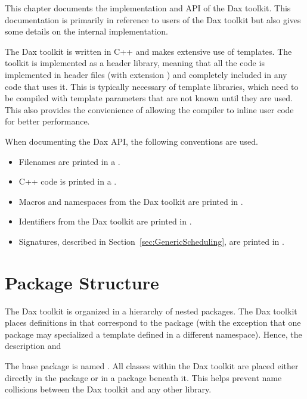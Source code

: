 
This chapter documents the implementation and API of the Dax toolkit. This
documentation is primarily in reference to users of the Dax toolkit but
also gives some details on the internal implementation.

The Dax toolkit is written in C++ and makes extensive use of templates. The
toolkit is implemented as a header library, meaning that all the code is
implemented in header files (with extension ) and
completely included in any code that uses it. This is typically necessary
of template libraries, which need to be compiled with template parameters
that are not known until they are used. This also provides the convienience
of allowing the compiler to inline user code for better performance.

When documenting the Dax API, the following conventions are used.
\begin{itemize}
\item Filenames are printed in a .
\item C++ code is printed in a .
\item Macros and namespaces from the Dax toolkit are printed
  in .
\item Identifiers from the Dax toolkit are printed in
  .
\item Signatures, described in Section~\ref{sec:GenericScheduling}, are
  printed in .
\end{itemize}

\section{Package Structure}
\label{sec:PackageStructure}


The Dax toolkit is organized in a hierarchy of nested packages. The Dax
toolkit places definitions in   that
correspond to the package (with the exception that one package may
specialized a template defined in a different namespace). Hence, the
description and

The base package is named \dax{}. All classes within the Dax toolkit are
placed either directly in the \dax{} package or in a package beneath
it. This helps prevent name collisions between the Dax toolkit and any
other library.

